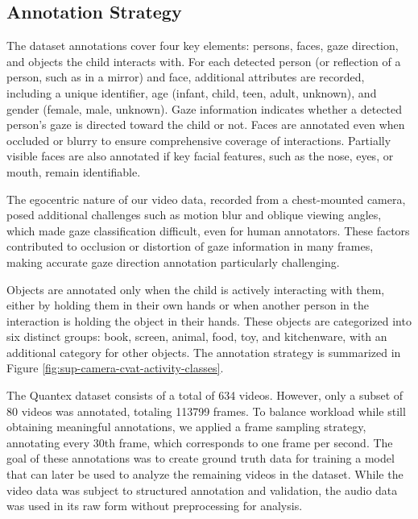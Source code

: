 \documentclass[
  man,floatsintext]{apa6}
\begin{document}
\subsection{Annotation Strategy}\label{sup-annotation-strategy}

The dataset annotations cover four key elements: persons, faces, gaze direction, and objects the child interacts with. For each detected person (or reflection of a person, such as in a mirror) and face, additional attributes are recorded, including a unique identifier, age (infant, child, teen, adult, unknown), and gender (female, male, unknown). Gaze information indicates whether a detected person's gaze is directed toward the child or not. Faces are annotated even when occluded or blurry to ensure comprehensive coverage of interactions. Partially visible faces are also annotated if key facial features, such as the nose, eyes, or mouth, remain identifiable.

The egocentric nature of our video data, recorded from a chest-mounted camera, posed additional challenges such as motion blur and oblique viewing angles, which made gaze classification difficult, even for human annotators. These factors contributed to occlusion or distortion of gaze information in many frames, making accurate gaze direction annotation particularly challenging.

Objects are annotated only when the child is actively interacting with them, either by holding them in their own hands or when another person in the interaction is holding the object in their hands. These objects are categorized into six distinct groups: book, screen, animal, food, toy, and kitchenware, with an additional category for other objects. The annotation strategy is summarized in Figure \ref{fig:sup-camera-cvat-activity-classes}.

The Quantex dataset consists of a total of 634 videos. However, only a subset of 80 videos was annotated, totaling 113799 frames. To balance workload while still obtaining meaningful annotations, we applied a frame sampling strategy, annotating every 30th frame, which corresponds to one frame per second. The goal of these annotations was to create ground truth data for training a model that can later be used to analyze the remaining videos in the dataset. While the video data was subject to structured annotation and validation, the audio data was used in its raw form without preprocessing for analysis.
\end{document}
